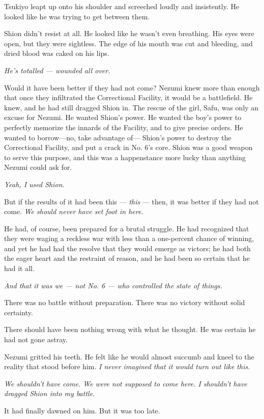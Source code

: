 Tsukiyo leapt up onto his shoulder and screeched loudly and insistently.
He looked like he was trying to get between them.

Shion didn't resist at all. He looked like he wasn't even breathing. His
eyes were open, but they were sightless. The edge of his mouth was cut
and bleeding, and dried blood was caked on his lips.

\emph{He's totalled --- wounded all over.}

Would it have been better if they had not come? Nezumi knew more than
enough that once they infiltrated the Correctional Facility, it would be
a battlefield. He knew, and he had still dragged Shion in. The rescue of
the girl, Safu, was only an excuse for Nezumi. He wanted Shion's power.
He wanted the boy's power to perfectly memorize the innards of the
Facility, and to give precise orders. He wanted to borrow---no, take
advantage of--- Shion's power to destroy the Correctional Facility, and
put a crack in No. 6's core. Shion was a good weapon to serve this
purpose, and this was a happenstance more lucky than anything Nezumi
could ask for.

\emph{Yeah, I used Shion.}

But if the results of it had been this --- \emph{this} --- then, it was better if
they had not come. \emph{We should never have set foot in here.}

He had, of course, been prepared for a brutal struggle. He had
recognized that they were waging a reckless war with less than a
one-percent chance of winning, and yet he had had the resolve that they
would emerge as victors; he had both the eager heart and the restraint
of reason, and he had been so certain that he had it all.

\emph{And that it was we --- not No. 6 --- who controlled the state of things.}

There was no battle without preparation. There was no victory without
solid certainty.

There should have been nothing wrong with what he thought. He was
certain he had not gone astray.

Nezumi gritted his teeth. He felt like he would almost succumb and kneel
to the reality that stood before him. \emph{I never imagined that it would
turn out like this.}

\emph{We shouldn't have come. We were not supposed to come here. I shouldn't
have dragged Shion into my battle.}

It had finally dawned on him. But it was too late.

